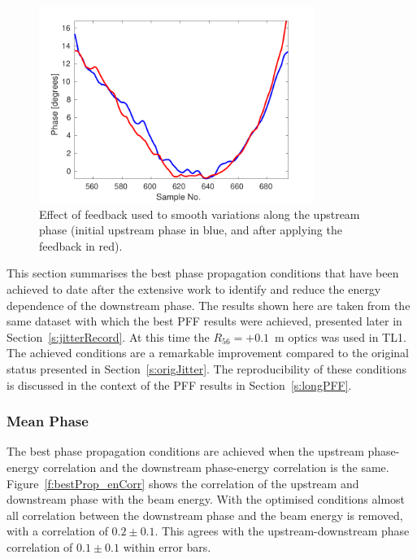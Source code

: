 \begin{figure}
  \centering
  \includegraphics[width=0.8\textwidth]{Figures/propagation/beforeAfterDavideFlatten}
  \caption{Effect of feedback used to smooth variations along the upstream phase (initial upstream phase in blue, and after applying the feedback in red).}
  \label{f:beforeAfterDavideFlatten}
\end{figure}



This section summarises the best phase propagation conditions that have been achieved to date after the extensive work to identify and reduce the energy dependence of the downstream phase. The results shown here are taken from the same dataset with which the best PFF results were achieved, presented later in Section~\ref{s:jitterRecord}. At this time the \(R_{56} = +0.1\)~m optics was used in TL1. The achieved conditions are a remarkable improvement compared to the original status presented in Section~\ref{s:origJitter}. The reproducibility of these conditions is discussed in the context of the PFF results in Section~\ref{s:longPFF}.

\subsubsection{Mean Phase}

The best phase propagation conditions are achieved when the upstream phase-energy correlation and the downstream phase-energy correlation is the same. Figure~\ref{f:bestProp_enCorr} shows the correlation of the upstream and downstream phase with the beam energy. With the optimised conditions almost all correlation between the downstream phase and the beam energy is removed, with a correlation of \(0.2\pm0.1\). This agrees with the upstream-downstream phase correlation of \(0.1\pm0.1\) within error bars.

